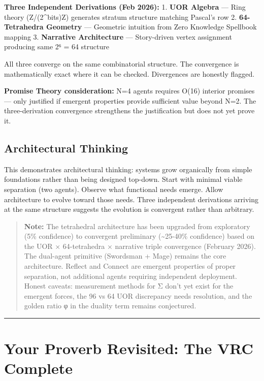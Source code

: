 \documentclass[
]{article}
\begin{document}
\textbf{Three Independent Derivations (Feb 2026):} 1. \textbf{UOR
Algebra} --- Ring theory (Z/(2\^{}bits)Z) generates stratum structure
matching Pascal's row 2. \textbf{64-Tetrahedra Geometry} --- Geometric
intuition from Zero Knowledge Spellbook mapping 3. \textbf{Narrative
Architecture} --- Story-driven vertex assignment producing same 2⁶ = 64
structure

All three converge on the same combinatorial structure. The convergence
is mathematically exact where it can be checked. Divergences are
honestly flagged.

\textbf{Promise Theory consideration:} N=4 agents requires O(16)
interior promises --- only justified if emergent properties provide
sufficient value beyond N=2. The three-derivation convergence
strengthens the justification but does not yet prove it.

\subsection{Architectural Thinking}\label{architectural-thinking}

This demonstrates architectural thinking: systems grow organically from
simple foundations rather than being designed top-down. Start with
minimal viable separation (two agents). Observe what functional needs
emerge. Allow architecture to evolve toward those needs. Three
independent derivations arriving at the same structure suggests the
evolution is convergent rather than arbitrary.

\begin{quote}
\textbf{Note:} The tetrahedral architecture has been upgraded from
exploratory (5\% confidence) to convergent preliminary
(\textasciitilde25-40\% confidence) based on the UOR × 64-tetrahedra ×
narrative triple convergence (February 2026). The dual-agent primitive
(Swordsman + Mage) remains the core architecture. Reflect and Connect
are emergent properties of proper separation, not additional agents
requiring independent deployment. Honest caveats: measurement methods
for Σ don't yet exist for the emergent forces, the 96 vs 64 UOR
discrepancy needs resolution, and the golden ratio φ in the duality term
remains conjectured.
\end{quote}

\begin{center}\rule{0.5\linewidth}{0.5pt}\end{center}

\section{Your Proverb Revisited: The VRC
Complete}\label{your-proverb-revisited-the-vrc-complete}
\end{document}
